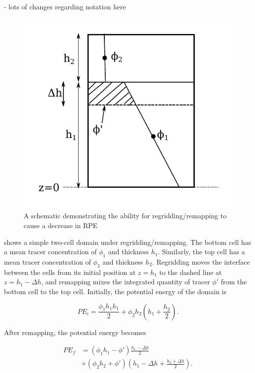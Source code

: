 - lots of changes regarding notation here

\begin{figure}
  \includegraphics{../plots/schematic.pdf}
  \caption{\label{fig:schematic} A schematic demonstrating the ability for regridding/remapping to cause a decrease in RPE}
\end{figure}

 shows a simple two-cell domain under regridding/remapping. The bottom cell has a mean tracer concentration of $\phi_1$ and thickness $h_1$. Similarly, the top cell has a mean tracer concentration of $\phi_2$ and thickness $h_2$. Regridding moves the interface between the cells from its initial position at $z = h_1$ to the dashed line at $z = h_1 - \Delta h$, and remapping mixes the integrated quantity of tracer $\phi'$ from the bottom cell to the top cell. Initially, the potential energy of the domain is

\begin{equation}
  PE_i = \frac{\phi_1 h_1 h_1}{2} + \phi_2 h_2\left(h_1 + \frac{h_2}{2}\right).
\end{equation}

After remapping, the potential energy becomes

\begin{equation}
  \begin{split}
    PE_f &= \left(\phi_1 h_1 - \phi'\right)\frac{h_1 - \Delta h}{2} \\
    &+ \left(\phi_2 h_2 + \phi'\right)\left(h_1 - \Delta h + \frac{h_2 + \Delta h}{2}\right).
  \end{split}
\end{equation}

